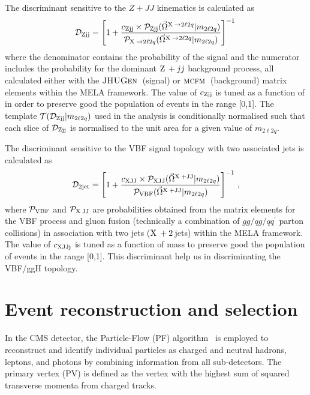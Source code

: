 The discriminant sensitive to the $Z+JJ$ kinematics is calculated as
\begin{eqnarray}
\label{eq:Zjjmela}
\mathcal{D}_{\rm Zjj} =
\left[1+  \frac{  c_{\rm Zjj}\times{\cal P}_\text{Zjj} (\vec\Omega^{\mathrm{X}\hspace{0.2em}\to2\ell2q} | m_{2\ell2q})}
{{\cal P}_{\mathrm{X}\hspace{0.2em}\to2\ell2q} (\vec\Omega^{\mathrm{X}\hspace{0.2em}\to2\ell2q} | m_{2\ell2q})} \right]^{-1}\,
\end{eqnarray}
where the denominator contains the probability of the signal
and the numerator includes the probability for the dominant $\mathrm{Z}\hspace{0.2em} +jj$ background process,
all calculated either with the
${\textsc{JHUGen}}\hspace{0.2em}{}$ (signal) or $\textsc{mcfm}\hspace{0.2em}{}$ (background) matrix elements within the MELA framework.
The value of $c_{\rm Zjj}$ is tuned as a function of \mZZ{} in order to preserve good
the population of events in the range [0,1]. The template ${\cal T}(\mathcal{D}_{\rm Zjj}|m_{2\ell2q})$ used in the analysis is conditionally
normalised such that each slice of $\mathcal{D}_{\rm Zjj}$ is normalised to the unit area
for a given value of $m_{2\ell2q}$.

The discriminant sensitive to the VBF signal topology with two associated jets
is calculated as~\cite{Khachatryan:2015cwa, Khachatryan:2015mma}
\begin{eqnarray}
%
\label{eq:vbfmela}
\mathcal{D}_{2\rm jet} =
\left[1+
\frac{ c_{\rm XJJ}\times\mathcal{P}_{\rm XJJ} (\vec\Omega^{\rm \PX+JJ} | m_{2\ell2q}) }
{\mathcal{P}_{\rm VBF}  (\vec\Omega^{\rm \PX+JJ} | m_{2\ell2q})  }\right]^{-1}
\,,
%
\end{eqnarray}
where $\mathcal{P}_{\rm VBF}$ and $\mathcal{P}_{\rm \mathrm{X}\hspace{0.2em} JJ}$ are probabilities obtained from the
\JHUGEN{} matrix elements for the VBF process and gluon fusion (technically a combination of
$gg/qg/qq^\prime$ parton collisions)
in association with two jets ($\mathrm{X}\hspace{0.2em}+2$\,jets) within the MELA framework.
The value of $c_{\rm XJJj}$ is tuned as a function of mass to preserve good
the population of events in the range [0,1]. This discriminant help us in discriminating the VBF/ggH topology.

\section{Event reconstruction and selection}
\label{sec:EventSelection}
%
In the CMS detector, the Particle-Flow (PF) algorithm~\cite{Sirunyan:2017ulk} is employed to reconstruct and identify individual particles as charged and neutral hadrons, leptons, and photons by combining information from all sub-detectors.
The primary vertex (PV) is defined as the vertex with the highest sum of squared transverse momenta from charged tracks.

